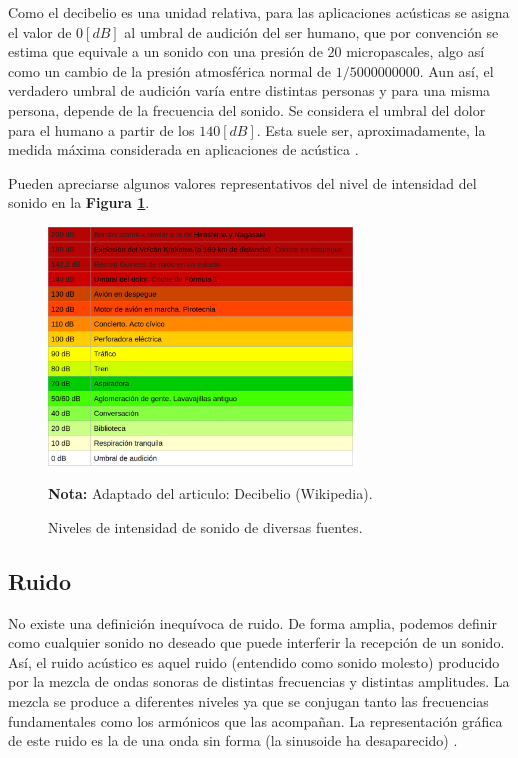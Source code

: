 \documentclass[letter,11pt]{article}
\newcommand{\source}[1]{\vspace{-11pt} \caption*{\small{\textbf{Nota:} {#1}}}}
\begin{document}
Como el decibelio es una unidad relativa, para las aplicaciones acústicas se
asigna el valor de $0 [dB]$ al umbral de audición del ser humano, que por
convención se estima que equivale a un sonido con una presión de $20$
micropascales, algo así como un cambio de la presión atmosférica normal de
$1/5 000 000 000$. Aun así, el verdadero umbral de audición varía entre
distintas personas y para una misma persona, depende de la frecuencia del
sonido. Se considera el umbral del dolor para el humano a partir de los
$140 [dB]$. Esta suele ser, aproximadamente, la medida máxima considerada en
aplicaciones de acústica \cite{WIKI1}.

Pueden apreciarse algunos valores representativos del nivel de intensidad del
sonido en la \textbf{Figura \ref{figura3}}.

\begin{figure}
\centering
\includegraphics[width=0.72\textwidth]{resources/f3.eps}
\caption{Niveles de intensidad de sonido de diversas fuentes.}
\label{figura3}
\source{Adaptado del articulo: Decibelio (Wikipedia).}
\end{figure}

\subsection{Ruido}

No existe una definición inequívoca de ruido. De forma amplia, podemos definir
como cualquier sonido no deseado que puede interferir la recepción de un sonido.
\\

Así, el ruido acústico es aquel ruido (entendido como sonido molesto) producido
por la mezcla de ondas sonoras de distintas frecuencias y distintas amplitudes.
La mezcla se produce a diferentes niveles ya que se conjugan tanto las
frecuencias fundamentales como los armónicos que las acompañan. La
representación gráfica de este ruido es la de una onda sin forma (la sinusoide
ha desaparecido) \cite{WIKI2}.
\\
\end{document}
